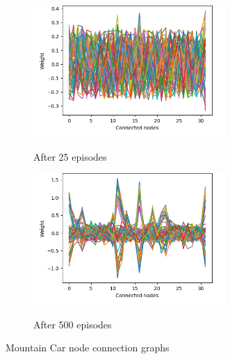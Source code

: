 \begin{figure}[H]
  \captionsetup[subfigure]{justification=centering}
  \centering
  \begin{subfigure}[t]{0.47\linewidth}
    {\includegraphics[height=5cm]{figures/images/mountain_car_nodes_25.png}}
    \caption{After 25 episodes}
  \end{subfigure}
  \hfill
  \begin{subfigure}[t]{0.47\linewidth}
    {\includegraphics[height=5cm]{figures/images/mountain_car_nodes_500.png}}
    \caption{After 500 episodes}
  \end{subfigure}
  \caption{Mountain Car node connection graphs}
  \label{fig:mountain_car_n_viz}
\end{figure}

